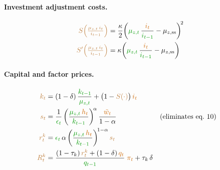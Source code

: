 \documentclass[11pt]{article}
\begin{document}
\paragraph{Investment adjustment costs.}
\begin{align*}
  \textcolor{brown}{S\!\left(\tfrac{\mu_{z,t}\,i_t}{i_{t-1}}\right)}
    &= \frac{\kappa}{2}\!\left(\textcolor{green!60!black}{\mu_{z,t}}\,
       \frac{\textcolor{orange!80!black}{i_t}}{\textcolor{green!60!black}{i_{t-1}}}
       - \mu_{z,\text{ss}}\right)^{\!2}
  \\
  \textcolor{brown}{S'\!\left(\tfrac{\mu_{z,t}\,i_t}{i_{t-1}}\right)}
    &= \kappa\!\left(\textcolor{green!60!black}{\mu_{z,t}}\,
       \frac{\textcolor{orange!80!black}{i_t}}{\textcolor{green!60!black}{i_{t-1}}}
       - \mu_{z,\text{ss}}\right)
\end{align*}

\paragraph{Capital and factor prices.}
\begin{align*}
  \textcolor{brown}{k_t}
    &= (1-\delta)\,\frac{\textcolor{green!60!black}{k_{t-1}}}{\textcolor{green!60!black}{\mu_{z,t}}}
       + \bigl(1-\textcolor{brown}{S(\cdot)}\bigr)\,\textcolor{orange!80!black}{i_t}
  \\
  \textcolor{brown}{s_t}
    &= \frac{1}{\textcolor{green!60!black}{\epsilon_t}}
       \left(\frac{\textcolor{green!60!black}{\mu_{z,t}}\,\textcolor{orange!80!black}{h_t}}
       {\textcolor{green!60!black}{k_{t-1}}}\right)^{\!\alpha}
       \frac{\textcolor{orange!80!black}{\tilde{w}_t}}{1-\alpha}
  & &\text{(eliminates eq.~10)}
  \\
  \textcolor{brown}{r_t^k}
    &= \textcolor{green!60!black}{\epsilon_t}\,\alpha
       \left(\frac{\textcolor{green!60!black}{\mu_{z,t}}\,\textcolor{orange!80!black}{h_t}}
       {\textcolor{green!60!black}{k_{t-1}}}\right)^{\!1-\alpha}\textcolor{brown}{s_t}
  \\
  \textcolor{brown}{R_t^k}
    &= \frac{(1-\tau_k)\,\textcolor{brown}{r_t^k} + (1-\delta)\,\textcolor{orange!80!black}{q_t}}
       {\textcolor{green!60!black}{q_{t-1}}}\;\textcolor{orange!80!black}{\pi_t}
       + \tau_k\,\delta
\end{align*}
\end{document}
